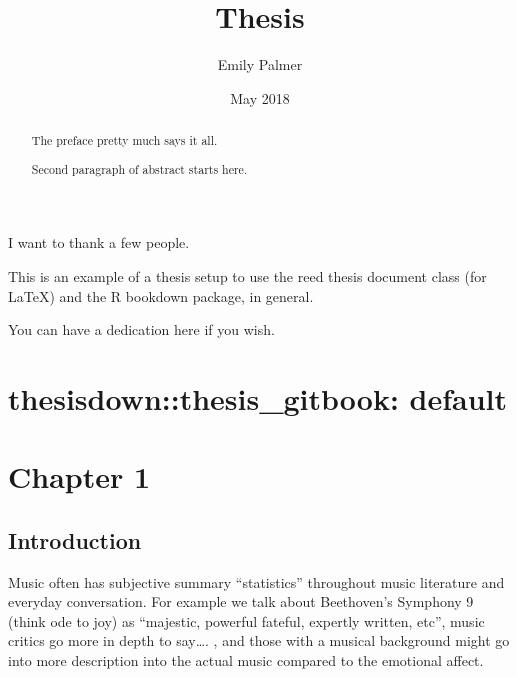 \documentclass[12pt,twoside]{reedthesis}
\title{Thesis}
\author{Emily Palmer}
\date{May 2018}
\theoremstyle{definition}
\theoremstyle{definition}
\theoremstyle{definition}
\theoremstyle{remark}
\begin{document}
  \maketitle

\frontmatter %
\pagestyle{empty} %
  \begin{acknowledgements}
    I want to thank a few people.
  \end{acknowledgements}
  \begin{preface}
    This is an example of a thesis setup to use the reed thesis document
    class (for LaTeX) and the R bookdown package, in general.
  \end{preface}
  \hypersetup{linkcolor=black}
  \setcounter{tocdepth}{2}
  \tableofcontents

  \listoftables

  \listoffigures
  \begin{abstract}
    The preface pretty much says it all. \par
    
    Second paragraph of abstract starts here.
  \end{abstract}
  \begin{dedication}
    You can have a dedication here if you wish.
  \end{dedication}
\mainmatter %
\pagestyle{fancyplain} %

\chapter{thesisdown::thesis\_gitbook:
default}\label{thesisdownthesis_gitbook-default}

\chapter{Chapter 1}\label{chapter-1}

\section{Introduction}\label{introduction}

Music often has subjective summary ``statistics'' throughout music
literature and everyday conversation. For example we talk about
Beethoven's Symphony 9 (think ode to joy) as ``majestic, powerful
fateful, expertly written, etc'', music critics go more in depth to
say\ldots{}. , and those with a musical background might go into more
description into the actual music compared to the emotional affect.
\end{document}
